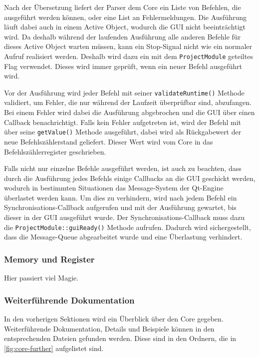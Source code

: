 Nach der Übersetzung liefert der Parser dem Core ein Liste von Befehlen, die
ausgeführt werden können, oder eine List an Fehlermeldungen. Die Ausführung
läuft dabei auch in einem Active Object, wodurch die GUI nicht beeinträchtigt
wird. Da deshalb während der laufenden Ausführung alle anderen Befehle für
dieses Active Object warten müssen, kann ein Stop-Signal nicht wie ein normaler
Aufruf realisiert werden. Deshalb wird dazu ein mit dem \texttt{ProjectModule}
geteiltes Flag verwendet. Dieses wird immer geprüft, wenn ein neuer Befehl
ausgeführt wird.

Vor der Ausführung wird jeder Befehl mit seiner \texttt{validateRuntime()}
Methode validiert, um Fehler, die nur während der Laufzeit überprüfbar sind,
abzufangen. Bei einem Fehler wird dabei die Ausführung abgebrochen und die GUI
über einen Callback benachrichtigt. Falls kein Fehler aufgetreten ist, wird der
Befehl mit über seine \texttt{getValue()} Methode ausgeführt, dabei wird als
Rückgabewert der neue Befehlszählerstand geliefert. Dieser Wert wird vom Core in
das Befehlszählerregister geschrieben.

Falls nicht nur einzelne Befehle ausgeführt werden, ist auch zu beachten, dass
durch die Ausführung jedes Befehls einige Callbacks an die GUI geschickt werden,
wodurch in bestimmten Situationen das Message-System der Qt-Engine überlastet
werden kann. Um dies zu verhindern, wird nach jedem Befehl ein
Synchronisations-Callback aufgerufen und mit der Ausführung gewartet, bis dieser
in der GUI ausgeführt wurde. Der Synchronisations-Callback muss dazu die
\texttt{ProjectModule::guiReady()} Methode aufrufen. Dadurch wird
sichergestellt, dass die Message-Queue abgearbeitet wurde und eine Überlastung
verhindert.

\subsubsection{Memory und Register}

Hier passiert viel Magie.

\subsubsection{Weiterführende Dokumentation}

In den vorherigen Sektionen wird ein Überblick über den Core gegeben. Weiterführende Dokumentation, Details und Beispiele können in den entsprechenden Dateien gefunden werden. Diese sind in den Ordnern, die in \autoref{fig:core-further} aufgelistet sind.

